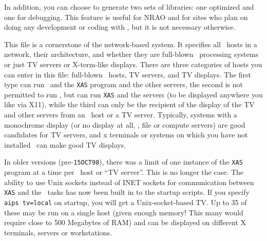 

In addition, you can choose to generate two sets of libraries: one
optimized and one for debugging.  This feature is useful for NRAO and
for sites who plan on doing any development or coding with \AIPS, but it
is not necessary otherwise.

\medskip{}

This file is a cornerstone of the network-based system.  It specifies
all \AIPS\ hosts in a network, their architecture, and whether they are
full-blown \AIPS\ processing systems or just TV servers or X-term-like
displays.  There are three categories of hosts you can enter in this
file: full-blown \AIPS\ hosts, TV servers, and TV displays.  The first
type can run \ttaips\ and the {\tt XAS} program and the other servers,
the second is not permitted to run \ttaips, but can run {\tt XAS} and
the servers (to be displayed anywhere you like via X11), while the third
can only be the recipient of the display of the TV and other servers
from an \AIPS\ host or a TV server.  Typically, systems with a
monochrome display (or no display at all, \eg, file or compute servers)
are good candidates for TV servers, and x terminals or systems on which
you have not installed
\AIPS\ can make good TV displays.

In older versions (pre-{\tt 15OCT98}), there was a limit of one instance
of the {\tt XAS} program at a time per \AIPS\ host or ``TV server''.
This is no longer the case.  The ability to use Unix sockets instead of
INET sockets for communication between {\tt XAS} and the \AIPS\ tasks
has now been built in to the startup scripts.  If you specify {\tt aips
tv=local} on startup, you will get a Unix-socket-based TV.  Up to 35 of
these may be run on a single host (given enough memory!  This many would
require close to 500 Megabytes of RAM) and can be displayed on different
X terminals, servers or workstations.

